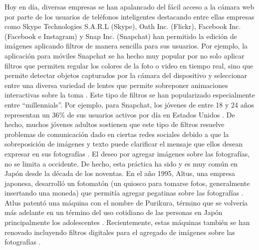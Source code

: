 \documentclass[a4paper,openright,12pt]{report}
\begin{document}
Hoy en día, diversas empresas se han apalancado del fácil acceso a la cámara web
por parte de los usuarios de teléfonos inteligentes destacando entre ellas
empresas como Skype Technologies S.A.R.L (Skype), Oath Inc. (Flickr),
Facebook Inc. (Facebook e Instagram) y Snap Inc. (Snapchat) han permitido la
edición de imágenes aplicando filtros de manera sencilla para sus usuarios. Por
ejemplo, la aplicación para móviles Snapchat se ha hecho muy popular por no solo
aplicar filtros que permiten regular los colores de la foto o video en tiempo
real, sino que permite detectar objetos capturados por la cámara del dispositivo
y seleccionar entre una diversa variedad de lentes que permite sobreponer
animaciones interactivas sobre la toma \cite{snap2017prospectus}⁠. Este tipo de
filtros se han popularizado especialmente entre “millennials”. Por ejemplo, para
Snapchat, los jóvenes de entre 18 y 24 años representan un 36\% de sus usuarios
activos por día en Estados Unidos \cite{snap2017prospectus}⁠. De hecho, muchos
jóvenes adultos sostienen que este tipo de filtros resuelve problemas de
comunicación dado en ciertas redes sociales debido a que la sobreposición de
imágenes y texto puede clarificar el mensaje que ellos desean expresar en sus
fotografías \cite{vaterlaus2016snapchat}. El deseo por agregar imágenes sobre
las fotografías, no se limita a occidente. De hecho, esta práctica ha sido y es
muy común en Japón desde la década de los noventas. En el año 1995, Altus, una
empresa japonesa, desarrolló un fotomatón (un quiosco para tomarse fotos,
generalmente insertando una moneda) que permitía agregar pegatinas sobre las
fotografías \cite{edwards2004photographs}. Atlus patentó una máquina con el
nombre de Purikura, término que se volvería más adelante en un término del uso
cotidiano de las personas en Japón principalmente los adolescentes
\cite{edwards2004photographs}. Recientemente, estas máquinas también se han
renovado incluyendo filtros digitales para el agregado de imágenes sobre las
fotografías \cite{TheOrigi29}.\\
\end{document}
